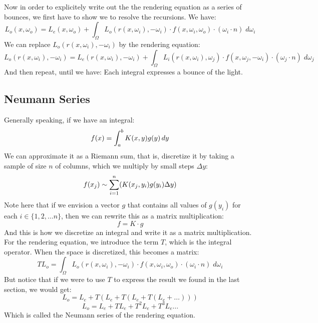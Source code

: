 \documentclass[12pt]{article}
\begin{document}
Now in order to explicitely write out the the rendering
equation as a series of bounces, we first have to
show we to resolve the recursions.
We have:
\[ L_{o}(x, \omega_o)
= L_{e}(x, \omega_o)
+ \int_\Omega L_o(r(x, \omega_i), -\omega_i)  \cdot
f(x, \omega_i, \omega_o) \cdot
(\omega_i \cdot n) \; d\omega_i \]
We can replace $L_o(r(x, \omega_i), -\omega_i)$
by the rendering equation:
\[ L_o(r(x, \omega_i), -\omega_i)
= L_{e}(r(x, \omega_i), -\omega_i)
+ \int_\Omega L_i(r(x, \omega_i), \omega_j) \cdot
f(x, \omega_j, -\omega_i) \cdot
(\omega_j \cdot n) \; d\omega_j \]
And then repeat, until we have:
Each integral expresses a bounce of the light. \\

\newpage

\subsection*{Neumann Series}

Generally speaking, if we have an integral:
\[ f(x) = \int_{a}^{b} K(x, y)g(y) \, dy \]
We can approximate it as a Riemann sum,
that is, discretize it
by taking a sample of size $n$ of columns,
which we multiply by small steps $\Delta y$:
\[ f(x_j) \sim \sum_{i = 1}^{n} (K(x_j, y_i)g(y_i) \Delta y) \]
Note here that if we envision
a vector $g$ that contains all values of $g(y_i)$
for each $i \in \{1, 2, \dots n\}$,
then we can rewrite this as a matrix multiplication:
\[ f = K \cdot g \]
And this is how we discretize an integral and write
it as a matrix multiplication. \\

For the rendering equation, we introduce the term $T$,
which is the integral operator. When the space
is discretized, this becomes a matrix:
\[ TL_o =  \int_\Omega L_o(r(x, \omega_i), -\omega_i)  \cdot
f(x, \omega_i, \omega_o) \cdot
(\omega_i \cdot n) \; d\omega_i \]
But notice that if we were to use $T$
to express the result we found in the last section, we
would get:
\[ L_o = L_e + T( L_e + T( L_e + T (L_e + \dots))) \]
\[ L_o = L_e + TL_e + T^2L_e + T^3L_e \dots \]
Which is called the Neumann series of the rendering equation. \\
\end{document}
